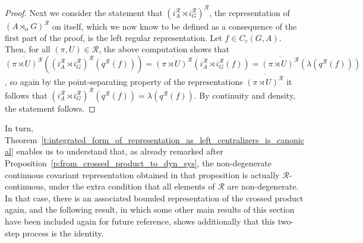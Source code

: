 \documentclass{amsart}
\theoremstyle{plain}
\theoremstyle{definition}
\numberwithin{equation}{section}
\begin{document}
\begin{proof}
Next we consider the statement that $(i_A^{\mathcal R}{\rtimes} i_G^{\mathcal R})^{\mathcal R}$, the representation of ${(A {\rtimes}_\alpha G)^\mathcal{R}}$ on itself, which we now know to be defined as a consequence of the first part of the proof, is the left regular representation. Let $f\in C_c(G,A)$. Then, for all ${(\pi,U)}\in{\mathcal R}$, the above computation shows that $\overline{({\pi \rtimes U})^{\mathcal R}}\left((i_A^{\mathcal R}{\rtimes} i_G^{\mathcal R})^{\mathcal R}({q^{\mathcal R}}(f))\right)=\overline{({\pi \rtimes U})^{\mathcal R}}\left(i_A^{\mathcal R}{\rtimes} i_G^{\mathcal R}(f)\right)=\overline{({\pi \rtimes U})^{\mathcal R}}(\lambda({q^{\mathcal R}}(f)))$, so again by the point-separating property of the representations $\overline{({\pi \rtimes U})^{\mathcal R}}$ it follows that $(i_A^{\mathcal R}{\rtimes} i_G^{\mathcal R})^{\mathcal R}({q^{\mathcal R}}(f))=\lambda({q^{\mathcal R}}(f))$. By continuity and density, the statement follows.
\end{proof}

In turn, Theorem~\ref{t:integrated_form_of_representation_as_left_centralizers_is_canonical}
enables us to understand that, as already remarked after Proposition~\ref{p:from_crossed_product_to_dyn_sys}, the non-degenerate continuous covariant representation obtained in that proposition is actually ${\mathcal R}$-continuous, under the extra condition that all elements of ${\mathcal R}$ are non-degenerate. In that case, there is an associated bounded representation of the crossed product again, and the following result, in which some other main results of this section have been included again for future reference, shows additionally that this two-step process is the identity.
\end{document}
